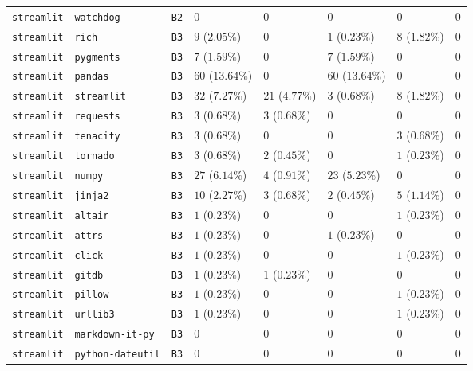 \begin{table}
\begin{tabular}{llllllll}
\texttt{streamlit} & \texttt{watchdog} & \texttt{B2} & $0$ & $0$ & $0$ & $0$ & $0$ \\
\texttt{streamlit} & \texttt{rich} & \texttt{B3} & $9$ ($2.05\%$) & $0$ & $1$ ($0.23\%$) & $8$ ($1.82\%$) & $0$ \\
\texttt{streamlit} & \texttt{pygments} & \texttt{B3} & $7$ ($1.59\%$) & $0$ & $7$ ($1.59\%$) & $0$ & $0$ \\
\texttt{streamlit} & \texttt{pandas} & \texttt{B3} & $60$ ($13.64\%$) & $0$ & $60$ ($13.64\%$) & $0$ & $0$ \\
\texttt{streamlit} & \texttt{streamlit} & \texttt{B3} & $32$ ($7.27\%$) & $21$ ($4.77\%$) & $3$ ($0.68\%$) & $8$ ($1.82\%$) & $0$ \\
\texttt{streamlit} & \texttt{requests} & \texttt{B3} & $3$ ($0.68\%$) & $3$ ($0.68\%$) & $0$ & $0$ & $0$ \\
\texttt{streamlit} & \texttt{tenacity} & \texttt{B3} & $3$ ($0.68\%$) & $0$ & $0$ & $3$ ($0.68\%$) & $0$ \\
\texttt{streamlit} & \texttt{tornado} & \texttt{B3} & $3$ ($0.68\%$) & $2$ ($0.45\%$) & $0$ & $1$ ($0.23\%$) & $0$ \\
\texttt{streamlit} & \texttt{numpy} & \texttt{B3} & $27$ ($6.14\%$) & $4$ ($0.91\%$) & $23$ ($5.23\%$) & $0$ & $0$ \\
\texttt{streamlit} & \texttt{jinja2} & \texttt{B3} & $10$ ($2.27\%$) & $3$ ($0.68\%$) & $2$ ($0.45\%$) & $5$ ($1.14\%$) & $0$ \\
\texttt{streamlit} & \texttt{altair} & \texttt{B3} & $1$ ($0.23\%$) & $0$ & $0$ & $1$ ($0.23\%$) & $0$ \\
\texttt{streamlit} & \texttt{attrs} & \texttt{B3} & $1$ ($0.23\%$) & $0$ & $1$ ($0.23\%$) & $0$ & $0$ \\
\texttt{streamlit} & \texttt{click} & \texttt{B3} & $1$ ($0.23\%$) & $0$ & $0$ & $1$ ($0.23\%$) & $0$ \\
\texttt{streamlit} & \texttt{gitdb} & \texttt{B3} & $1$ ($0.23\%$) & $1$ ($0.23\%$) & $0$ & $0$ & $0$ \\
\texttt{streamlit} & \texttt{pillow} & \texttt{B3} & $1$ ($0.23\%$) & $0$ & $0$ & $1$ ($0.23\%$) & $0$ \\
\texttt{streamlit} & \texttt{urllib3} & \texttt{B3} & $1$ ($0.23\%$) & $0$ & $0$ & $1$ ($0.23\%$) & $0$ \\
\texttt{streamlit} & \texttt{markdown-it-py} & \texttt{B3} & $0$ & $0$ & $0$ & $0$ & $0$ \\
\texttt{streamlit} & \texttt{python-dateutil} & \texttt{B3} & $0$ & $0$ & $0$ & $0$ & $0$ \\

\end{tabular}
\end{table}
